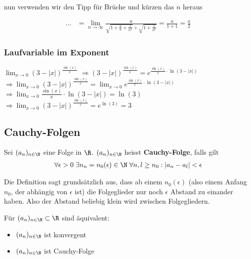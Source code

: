 nun verwenden wir den Tipp für Brüche und kürzen das $n$ heraus

\begin{align*}
\ldots &= \lim_{n \to \infty} \frac{a}{\sqrt{1 + \frac{a}{n} + \frac{1}{n^2}} +
\sqrt{1 + \frac{1}{n^2}}} = \frac{a}{1 + 1} = \frac{a}{2}
\end{align*}


\subsubsection{Laufvariable im Exponent}
$\lim_{x \to 0} (3 - |x|)^{\frac{\sin(x)}{x}}$\newline
$\Rightarrow (3 - |x|)^{\frac{\sin(x)}{x}} = e^{\frac{\sin(x)}{x} \cdot \ln(3 -
|x|)}$\newline
$\Rightarrow 
\lim_{x \to 0} (3 - |x|)^{\frac{\sin(x)}{x}} = \lim_{x \to 0}e^{\frac{\sin(x)}{x} \cdot \ln(3 -
|x|)}$\newline
$\Rightarrow \lim_{x \to 0}\frac{\sin(x)}{x}\cdot \ln(3-|x|) = \ln(3)$\newline
$\Rightarrow \lim_{x \to 0}(3 - |x|)^{\frac{\sin(x)}{x}} = e^{\ln(3)} = 3$

\subsection{Cauchy-Folgen}
\begin{definition}
Sei $(a_n)_{n \in \N}$ eine Folge in $\R$. $(a_n)_{n \in \N}$ heisst \textbf{Cauchy-Folge}, falls gilt
\begin{align*}
\forall \epsilon > 0 \; \exists n_n = n_0(\epsilon) \in \N \; \forall n, l \geq n_0: |a_n - a_l| < \epsilon
\end{align*}
\end{definition}

Die Definition sagt grundsätzlich aus, dass ab einem $n_0(\epsilon)$ (also einem Anfang $n_0$, der abhängig von $\epsilon$ ist)
die Folgeglieder nur noch $\epsilon$ Abstand zu einander haben. Also der Abstand beliebig klein wird zwischen Folgegliedern.

\begin{satz}
Für $(a_n)_{n \in \N} \subset \R$ sind äquivalent:
\begin{itemize}
	\item $(a_n)_{n \in \N}$ ist konvergent
	\item $(a_n)_{n \in \N}$ ist Cauchy-Folge
\end{itemize}
\end{satz}
